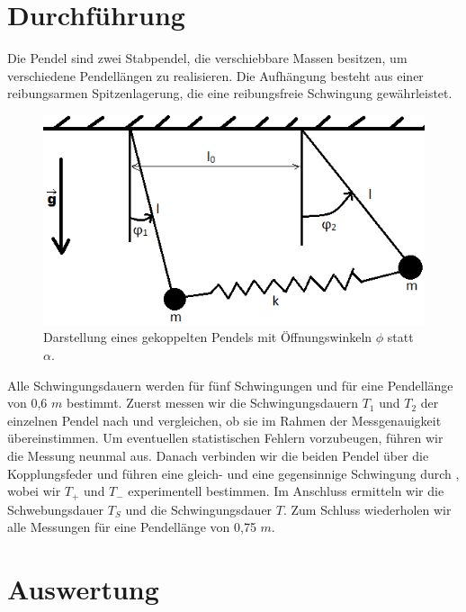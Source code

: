 \section{Durchführung}
Die Pendel sind zwei Stabpendel, die verschiebbare Massen besitzen, um verschiedene Pendellängen zu realisieren. Die
Aufhängung besteht aus einer reibungsarmen Spitzenlagerung, die eine reibungsfreie Schwingung gewährleistet.
\begin{figure}[h]
  \centering
  \includegraphics{gekoppelte_pendel2.png}
  \caption{Darstellung eines gekoppelten Pendels mit Öffnungswinkeln $\phi$ statt $\alpha$.}
  \label{fig:skizze1}
\end{figure}
Alle Schwingungsdauern werden für fünf Schwingungen und für eine Pendellänge von 0,6 $\textit{m}$ bestimmt. Zuerst messen wir die Schwingungsdauern $\textit{T}_{1}$
und $\textit{T}_{2}$ der einzelnen Pendel nach und vergleichen, ob sie im Rahmen der Messgenauigkeit übereinstimmen. Um eventuellen
statistischen Fehlern vorzubeugen, führen wir die Messung neunmal aus. Danach verbinden wir die beiden Pendel über die Kopplungsfeder und führen eine gleich-
und eine gegensinnige Schwingung durch , wobei wir $\textit{T}_{+}$ und $\textit{T}_{-}$ experimentell bestimmen. Im
Anschluss ermitteln wir die Schwebungsdauer $\textit{T}_{S}$ und die Schwingungsdauer $\textit{T}$. Zum Schluss wiederholen wir
alle Messungen für eine Pendellänge von 0,75 $\textit{m}$.
\section{Auswertung}
